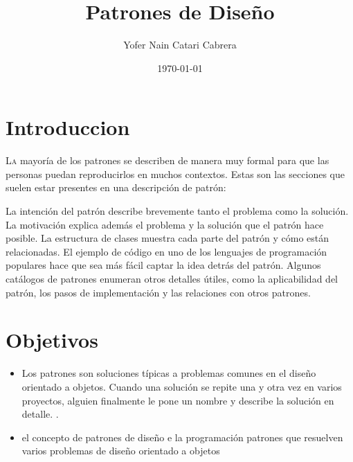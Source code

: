 \documentclass[twoside,twocolumn]{article}
\title{Patrones de Diseño} %
\author{Yofer Nain Catari Cabrera}
\date{\today} %
\begin{document}
\maketitle


\section{Introduccion}

\lettrine[nindent=0em,lines=3]{L}a mayoría de los patrones se describen de manera muy formal para que las personas puedan reproducirlos en muchos contextos. Estas son las secciones que suelen estar presentes en una descripción de patrón:

La intención del patrón describe brevemente tanto el problema como la solución.
La motivación explica además el problema y la solución que el patrón hace posible.
La estructura de clases muestra cada parte del patrón y cómo están relacionadas.
El ejemplo de código en uno de los lenguajes de programación populares hace que sea más fácil captar la idea detrás del patrón.
Algunos catálogos de patrones enumeran otros detalles útiles, como la aplicabilidad del patrón, los pasos de implementación y las relaciones con otros patrones.




\section{Objetivos}

\begin{itemize}
\item  Los patrones son soluciones típicas a problemas comunes en el diseño orientado a objetos. Cuando una solución se repite una y otra vez en varios proyectos, alguien finalmente le pone un nombre y describe la solución en detalle. .
\item el concepto de patrones de diseño e la programación
patrones que resuelven varios problemas de diseño orientado a objetos



\end{itemize}
\end{document}

